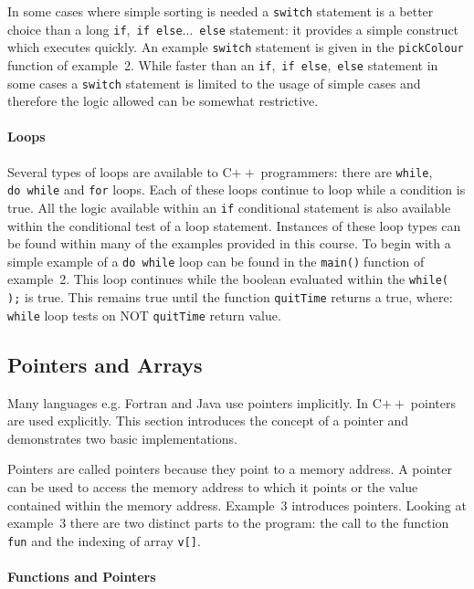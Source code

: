 \documentclass[11pt,a4paper]{scrartcl}
\def\cpp{C$++\;$}
\def\main{\texttt{main()}$\;$}
\begin{document}
In some cases where simple sorting is needed a \texttt{switch}
statement is a better choice than a long
\texttt{if},~\texttt{if~else}...~\texttt{else} statement: it provides a simple construct which executes quickly.  An example
\texttt{switch} statement is given in the \texttt{pickColour} function
of example~2.  While faster than an
\texttt{if},~\texttt{if~else},~\texttt{else} statement in some cases a
\texttt{switch} statement is limited to the usage
of simple cases and therefore the logic allowed can be somewhat
restrictive.

\paragraph{Loops}
Several types of loops are available to \cpp programmers: there are
\texttt{while}, \texttt{do~while} and \texttt{for} loops.  Each of
these loops continue to loop while a condition is true.  All the logic
available within an \texttt{if} conditional statement is also
available within the conditional test of a loop statement.  Instances
of these loop types can be found within many of the examples provided
in this course.  To begin with a simple example of a \texttt{do~while}
loop can be found in the \main function of example~2.  This loop
continues while the boolean evaluated within the \texttt{while( );} is
true.  This remains true until the function \texttt{quitTime} returns
a true, where: \texttt{while} loop tests on NOT \texttt{quitTime} return value.


\subsection{Pointers and Arrays \label{section:pointersarrays}}
Many languages e.g. Fortran and Java use pointers implicitly.  In
\cpp pointers are used explicitly.  This section introduces the
concept of a pointer and demonstrates two basic implementations.

Pointers are called pointers because they point to a memory address.
A pointer can be used to access the memory address to which it points
or the value contained within the memory address.  Example~3
introduces pointers.  Looking at example~3 there are two distinct
parts to the program: the call to the function \texttt{fun} and the
indexing of array \texttt{v[]}.

\paragraph{Functions and Pointers}
\end{document}

